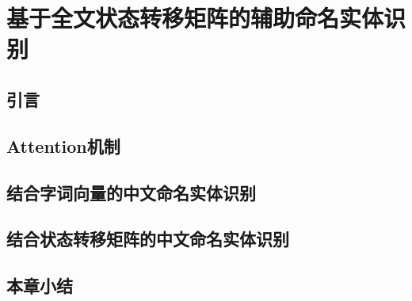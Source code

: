 \chapter{基于全文状态转移矩阵的辅助命名实体识别}
\section{引言}
\section{Attention机制}
\section{结合字词向量的中文命名实体识别}
\section{结合状态转移矩阵的中文命名实体识别}
\section{本章小结}
